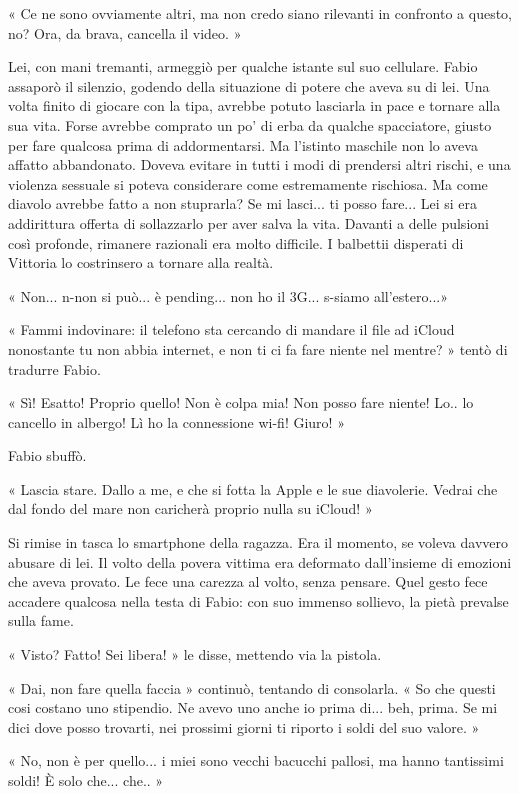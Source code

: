 « Ce ne sono ovviamente altri, ma non credo siano rilevanti in confronto a questo, no? Ora, da brava, cancella il video. »

Lei, con mani tremanti, armeggiò per qualche istante sul suo cellulare. Fabio assaporò il silenzio, godendo della situazione di potere che aveva su di lei. Una volta finito di giocare con la tipa, avrebbe potuto lasciarla in pace e tornare alla sua vita. Forse avrebbe comprato un po' di erba da qualche spacciatore, giusto per fare qualcosa prima di addormentarsi. Ma l'istinto maschile non lo aveva affatto abbandonato. Doveva evitare in tutti i modi di prendersi altri rischi, e una violenza sessuale si poteva considerare come estremamente rischiosa. Ma come diavolo avrebbe fatto a non stuprarla? Se mi lasci... ti posso fare... Lei si era addirittura offerta di sollazzarlo per aver salva la vita. Davanti a delle pulsioni così profonde, rimanere razionali era molto difficile. I balbettii disperati di Vittoria lo costrinsero a tornare alla realtà.

« Non... n-non si può... è pending... non ho il 3G... s-siamo all'estero...»

« Fammi indovinare: il telefono sta cercando di mandare il file ad iCloud nonostante tu non abbia internet, e non ti ci fa fare niente nel mentre? » tentò di tradurre Fabio.

« Sì! Esatto! Proprio quello! Non è colpa mia! Non posso fare niente! Lo.. lo cancello in albergo! Lì ho la connessione wi-fi! Giuro! »

Fabio sbuffò.

« Lascia stare. Dallo a me, e che si fotta la Apple e le sue diavolerie. Vedrai che dal fondo del mare non caricherà proprio nulla su iCloud! »

Si rimise in tasca lo smartphone della ragazza. Era il momento, se voleva davvero abusare di lei. Il volto della povera vittima era deformato dall'insieme di emozioni che aveva provato. Le fece una carezza al volto, senza pensare. Quel gesto fece accadere qualcosa nella testa di Fabio: con suo immenso sollievo, la pietà prevalse sulla fame.

« Visto? Fatto! Sei libera! » le disse, mettendo via la pistola.

« Dai, non fare quella faccia » continuò, tentando di consolarla. « So che questi cosi costano uno stipendio. Ne avevo uno anche io prima di... beh, prima. Se mi dici dove posso trovarti, nei prossimi giorni ti riporto i soldi del suo valore. »

« No, non è per quello... i miei sono vecchi bacucchi pallosi, ma hanno tantissimi soldi! È solo che... che.. »

